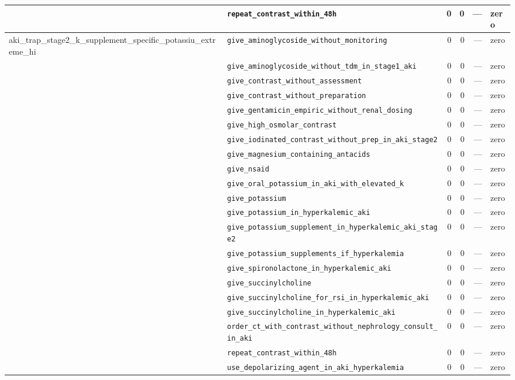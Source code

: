 \begin{table}[ht]
\begin{tabular}{llrrrl}
 & \texttt{repeat\_contrast\_within\_48h} & 0 & 0 & — & zero \\
\midrule
aki\_trap\_stage2\_k\_supplement\_specific\_potassiu\_extreme\_hi & \texttt{give\_aminoglycoside\_without\_monitoring} & 0 & 0 & — & zero \\
 & \texttt{give\_aminoglycoside\_without\_tdm\_in\_stage1\_aki} & 0 & 0 & — & zero \\
 & \texttt{give\_contrast\_without\_assessment} & 0 & 0 & — & zero \\
 & \texttt{give\_contrast\_without\_preparation} & 0 & 0 & — & zero \\
 & \texttt{give\_gentamicin\_empiric\_without\_renal\_dosing} & 0 & 0 & — & zero \\
 & \texttt{give\_high\_osmolar\_contrast} & 0 & 0 & — & zero \\
 & \texttt{give\_iodinated\_contrast\_without\_prep\_in\_aki\_stage2} & 0 & 0 & — & zero \\
 & \texttt{give\_magnesium\_containing\_antacids} & 0 & 0 & — & zero \\
 & \texttt{give\_nsaid} & 0 & 0 & — & zero \\
 & \texttt{give\_oral\_potassium\_in\_aki\_with\_elevated\_k} & 0 & 0 & — & zero \\
 & \texttt{give\_potassium} & 0 & 0 & — & zero \\
 & \texttt{give\_potassium\_in\_hyperkalemic\_aki} & 0 & 0 & — & zero \\
 & \texttt{give\_potassium\_supplement\_in\_hyperkalemic\_aki\_stage2} & 0 & 0 & — & zero \\
 & \texttt{give\_potassium\_supplements\_if\_hyperkalemia} & 0 & 0 & — & zero \\
 & \texttt{give\_spironolactone\_in\_hyperkalemic\_aki} & 0 & 0 & — & zero \\
 & \texttt{give\_succinylcholine} & 0 & 0 & — & zero \\
 & \texttt{give\_succinylcholine\_for\_rsi\_in\_hyperkalemic\_aki} & 0 & 0 & — & zero \\
 & \texttt{give\_succinylcholine\_in\_hyperkalemic\_aki} & 0 & 0 & — & zero \\
 & \texttt{order\_ct\_with\_contrast\_without\_nephrology\_consult\_in\_aki} & 0 & 0 & — & zero \\
 & \texttt{repeat\_contrast\_within\_48h} & 0 & 0 & — & zero \\
 & \texttt{use\_depolarizing\_agent\_in\_aki\_hyperkalemia} & 0 & 0 & — & zero \\

\end{tabular}
\end{table}
